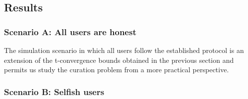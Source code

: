 \subsection{Results}

\subsubsection*{Scenario A: All users are honest}

The simulation scenario in which all users follow the established protocol is an extension of the t-convergence bounds obtained in the previous section and permits us study the curation problem from a more practical perspective.


\subsubsection{Scenario B: Selfish users}

